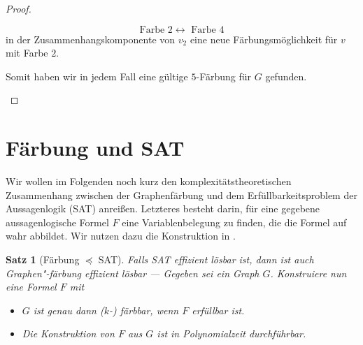\documentclass[ngerman, a4paper, 12pt]{article}
\newcounter{themcount}
\theoremstyle{plain}
\newtheorem{satz}[themcount]{Satz}
\theoremstyle{break}
\theoremstyle{proofstyle}
\newtheorem{proof}{Beweis}
\begin{document}
\begin{proof}
\begin{description}
\begin{enumerate}[label=Fall \arabic*:]
\begin{enumerate}[label=\alph*),topsep=-\parskip]
				\begin{equation*}
					\text{Farbe } 2 \leftrightarrow \text{ Farbe } 4
				\end{equation*}
				in der Zusammenhangskomponente von $v_2$ eine neue Färbungsmöglichkeit für $v$ mit Farbe $2$.
			\end{enumerate}
		\end{enumerate}
		Somit haben wir in jedem Fall eine gültige $5$-Färbung für $G$ gefunden.
		\end{description}
	\end{proof}

	\section{Färbung und SAT}
	
	Wir wollen im Folgenden noch kurz den komplexitätstheoretischen Zusammenhang zwischen der Graphenfärbung und dem Erfüllbarkeitsproblem der Aussagenlogik (SAT) anreißen. Letzteres besteht darin, für eine gegebene aussagenlogische Formel $F$ eine Variablenbelegung zu finden, die die Formel auf wahr abbildet.
	Wir nutzen dazu die Konstruktion in \cite{mehlhorn}.

	\begin{satz}[Färbung $\preccurlyeq$ SAT]
		\label{satz: faerbung-sat}
		Falls SAT effizient lösbar ist, dann ist auch Graphen"-färbung effizient lösbar --- Gegeben sei ein Graph $G$. Konstruiere nun eine Formel $F$ mit
		\begin{itemize}[nolistsep, topsep=-\parskip]
			\item $G$ ist genau dann ($k$-) färbbar, wenn $F$ erfüllbar ist.
			\item Die Konstruktion von $F$ aus $G$ ist in Polynomialzeit durchführbar.
		\end{itemize}
	\end{satz}
\end{document}
